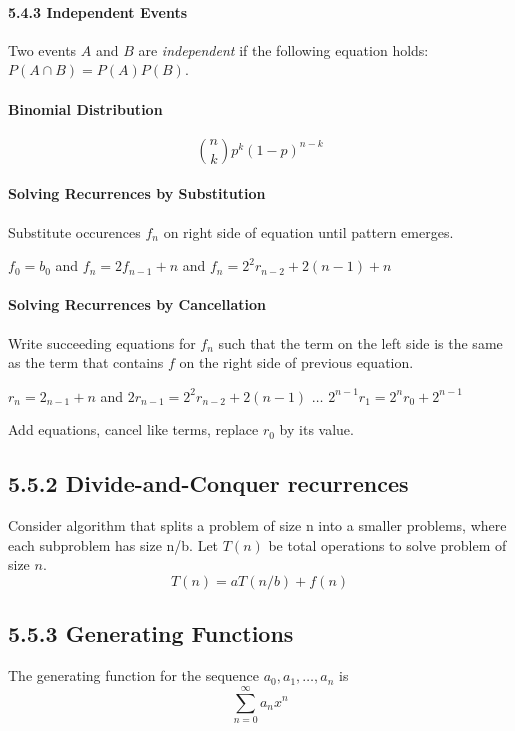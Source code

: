 \documentclass[10pt,twocolumn]{article}
\begin{document}
	\paragraph*{5.4.3 Independent Events}
	Two events $A$ and $B$ are \emph{independent} if the following
        equation holds: $P(A \cap B)=P(A)P(B)$.
	
	\paragraph*{Binomial Distribution}
	\[\binom{n}{k}p^k(1-p)^{n-k}\]

	\paragraph*{Solving Recurrences by Substitution}
	Substitute occurences $f_n$ on right side of equation until pattern emerges.
	\begin{flushleft}$f_0=b_0$ and $f_n=2f_{n-1}+n$ and $f_n=2^2r_{n-2}+2(n-1)+n$\end{flushleft}
	
	\paragraph*{Solving Recurrences by Cancellation}
	Write succeeding equations for $f_n$ such that the term on the
        left side is the same as the term that contains $f$ on the
        right side of previous equation.
        \begin{flushleft}$r_n=2_{n-1}+n$ and
          $2r_{n-1}=2^2r_{n-2}+2(n-1)$
          $\ldots$ $2^{n-1}r_1=2^nr_0+2^{n-1}$
        \end{flushleft}
	Add equations, cancel like terms, replace $r_0$ by its value.
	
	\subsection*{5.5.2 Divide-and-Conquer recurrences}
	Consider algorithm that splits a problem of size n into a smaller problems, where each subproblem has size n/b.  Let $T(n)$ be total operations to solve problem of size $n$.
		\[T(n)=aT(n/b)+f(n)\]
	
	\subsection*{5.5.3 Generating Functions}
	The generating function for the sequence $a_0, a_1, \ldots, a_n$ is
		\[\sum_{n=0}^\infty a_nx^n\]
\end{document}
